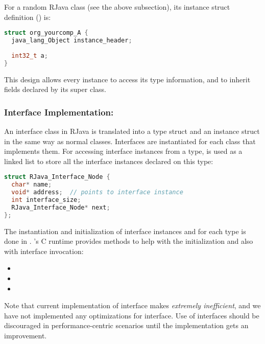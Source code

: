 \documentclass[12pt]{article}
\begin{document}
For a random RJava class  (see the above
subsection), its instance struct definition () is:
\begin{lstlisting}[language=c]
struct org_yourcomp_A {
  java_lang_Object instance_header;
  
  int32_t a;
}
\end{lstlisting}

This design allows every instance to access its type information, and
to inherit fields declared by its super class. 

\subsubsection{Interface Implementation: }

An interface class in RJava is translated into a type struct and an instance
struct in the same way as normal classes. Interfaces are instantiated
for each class that implements them. For accessing interface instances
from a type,  is used as a linked list to store
all the interface instances declared on this type:

\begin{lstlisting}[language=c]
struct RJava_Interface_Node {
  char* name;
  void* address;  // points to interface instance
  int interface_size;
  RJava_Interface_Node* next;
};
\end{lstlisting}

The instantiation and initialization of interface instances and 
 for each type is done in 
. \rjc's C runtime provides methods
to help with the initialization and also with interface invocation:

\begin{itemize}
\item
{}
\item
{}
\item
{}
\end{itemize}

Note that current implementation of interface makes 
\emph{extremely inefficient}, and we have not implemented any optimizations
for interface. Use of interfaces should be discouraged in 
performance-centric scenarios until the
implementation gets an improvement. 
\end{document}
